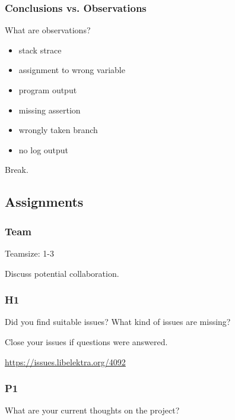 
\begin{frame}
	\frametitle{Conclusions vs. Observations}

	What are observations?

	\begin{itemize}[<+-| alert@+>]
		\item stack strace
		\item assignment to wrong variable
		\item program output
		\item missing assertion
		\item wrongly taken branch
		\item no log output
	\end{itemize}
\end{frame}

\begin{assignment}
	\begin{task}
	Break.
	\end{task}
\end{assignment}

\subsection{Assignments}

\begin{assignment}
	\frametitle{Team}
	Teamsize: 1-3

	\begin{task}
	Discuss potential collaboration.
	\end{task}
\end{assignment}

\begin{assignment}
	\frametitle{H1}

	\begin{task}
	Did you find suitable issues?
	What kind of issues are missing?
	\end{task}

	\begin{task}
	Close your issues if questions were answered.
	\end{task}

	\url{https://issues.libelektra.org/4092}
\end{assignment}

\begin{assignment}
	\frametitle{P1}

	\begin{task}
	What are your current thoughts on the project?
	\end{task}
\end{assignment}

